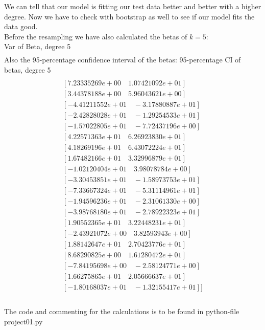 \documentclass[a4paper,norsk]{article}
\begin{document}
We can tell that our model is fitting our test data better and better with a higher degree. Now we have to check with bootstrap as well to see if our model fits the data good.
\\Before the resampling we have also calculated the betas of $k=5$:
\\Var of Beta, degree 5
\begin{align*}
[9.47238055e-03\quad 8.01217226e-01 \quad4.12183842e-01\quad 9.89887798e+00\\
8.39455751e+00\quad 4.14211294e+00\quad 2.71771303e+01\quad 3.28888083e+01\\
1.78285914e+01\quad 1.31093669e+01\quad 1.91368860e+01\quad 2.67004422e+01\\
1.91391193e+01\quad 9.34737951e+00\quad 1.13215581e+01\quad 2.55450522e+00\\
4.40599813e+00\quad 3.60735967e+00\quad 1.80107762e+00\quad 1.00979408e+00\\
1.50021893e+00]
\end{align*}
Also the 95-percentage confidence interval of the betas:
95-percentage CI of betas, degree 5
\begin{align*}
[[ 7.25873511e-02\quad  4.54098870e-01]\\
[ 7.23335269e+00\quad  1.07421092e+01]\\
[ 3.44378188e+00\quad 5.96043621e+00]\\
[-4.41211552e+01\quad -3.17880887e+01]\\
[-2.42828028e+01\quad -1.29254533e+01]\\
[-1.57022805e+01\quad -7.72437196e+00]\\
[ 4.22571363e+01\quad  6.26923830e+01]\\
[ 4.18269196e+01\quad  6.43072224e+01]\\
[ 1.67482166e+01\quad  3.32996879e+01]\\
[-1.02120404e+01\quad  3.98078784e+00]\\
[-3.30453851e+01\quad -1.58973753e+01]\\
[-7.33667324e+01\quad -5.31114961e+01]\\
[-1.94596236e+01\quad -2.31061330e+00]\\
[-3.98768180e+01\quad -2.78922323e+01]\\
[ 1.90552365e+01\quad  3.22448231e+01]\\
[-2.43921072e+00\quad  3.82593943e+00]\\
[ 1.88142647e+01\quad  2.70423776e+01]\\
[ 8.68290825e+00\quad  1.61280472e+01]\\
[-7.84195698e+00\quad -2.58124771e+00]\\
[ 1.66275865e+01\quad  2.05666637e+01]\\
[-1.80168037e+01\quad -1.32155417e+01]]\\
\end{align*}
\\ The code and commenting for the calculations is to be found in python-file project01.py
\end{document}
